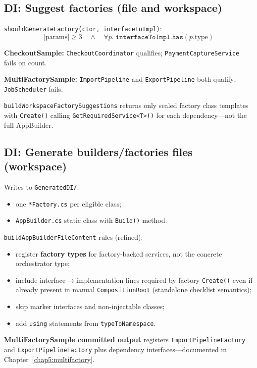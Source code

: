 \subsection{DI: Suggest factories (file and workspace)}

\texttt{shouldGenerateFactory(ctor, interfaceToImpl)}:
\[
|\text{params}| \geq 3 \quad \land \quad \forall p.\; \texttt{interfaceToImpl.has}(p.\text{type})
\]

\textbf{CheckoutSample:} \texttt{CheckoutCoordinator} qualifies; \texttt{PaymentCaptureService} fails on count.

\textbf{MultiFactorySample:} \texttt{ImportPipeline} and \texttt{ExportPipeline} both qualify; \texttt{JobScheduler} fails.

\texttt{buildWorkspaceFactorySuggestions} returns only sealed factory class templates with \texttt{Create()} calling \texttt{GetRequiredService<T>()} for each dependency---not the full AppBuilder.

\subsection{DI: Generate builders/factories files (workspace)}

Writes to \texttt{GeneratedDI/}:
\begin{itemize}
	\item one \texttt{*Factory.cs} per eligible class;
	\item \texttt{AppBuilder.cs} static class with \texttt{Build()} method.
\end{itemize}

\texttt{buildAppBuilderFileContent} rules (refined):
\begin{itemize}
	\item register \textbf{factory types} for factory-backed services, not the concrete orchestrator type;
	\item include interface$\rightarrow$implementation lines required by factory \texttt{Create()} even if already present in manual \texttt{CompositionRoot} (standalone checklist semantics);
	\item skip marker interfaces and non-injectable classes;
	\item add \texttt{using} statements from \texttt{typeToNamespace}.
\end{itemize}

\textbf{MultiFactorySample committed output} registers \texttt{ImportPipelineFactory} and \texttt{ExportPipelineFactory} plus dependency interfaces---documented in Chapter~\ref{chap5:multifactory}.


